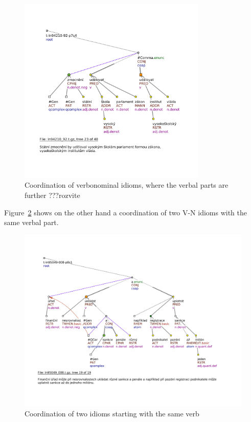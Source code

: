 \documentclass[11pt, a4paper]{article}
\begin{document}
\begin{figure}[h]
\includegraphics[width=0.8\textwidth]{images/vyhledavky/cphr-echild.pdf}
\caption{Coordination of verbonominal idioms, where the verbal parts are further ???rozvite }
\label{fig:cphr-echild}
\end{figure}

Figure~\ref{fig:cphr-echild2} shows on the other hand a coordination of two V-N idioms with the same verbal part.
\begin{figure}[h]
\includegraphics[width=\textwidth]{images/vyhledavky/cphr-ukladat-sankce-a-penale.pdf}
\caption{Coordination of two idioms starting with the same verb}
\label{fig:cphr-echild2}
\end{figure}
\end{document}

